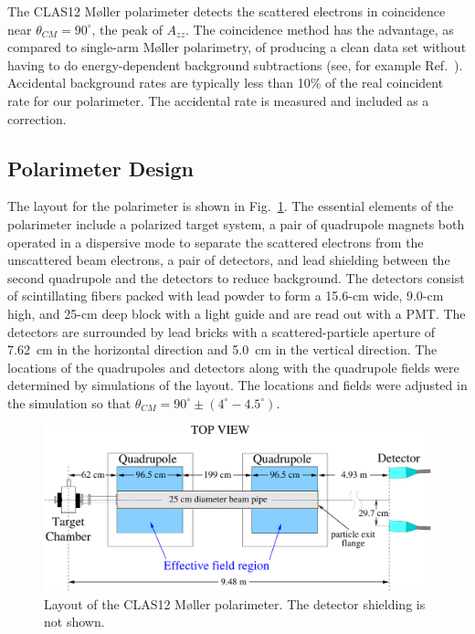 The CLAS12 M{\o}ller polarimeter detects the scattered electrons in coincidence near $\theta_{CM}=90^\circ$, the
peak of $A_{zz}$. The coincidence method has the advantage, as compared to single-arm M{\o}ller polarimetry, of
producing a clean data set without having to do energy-dependent background subtractions (see, for example
Ref.~\cite{arrington92}). Accidental background rates are typically less than 10\% of the real coincident rate for
our polarimeter. The accidental rate is measured and included as a correction.

\subsection{Polarimeter Design}
\label{sec-PolDesign}

The layout for the polarimeter is shown in Fig.~\ref{fig-PolLayout}. The essential elements of the polarimeter include
a polarized target system, a pair of quadrupole magnets both operated in a dispersive mode to separate the
scattered electrons from the unscattered beam electrons, a pair of detectors, and lead shielding between the second
quadrupole and the detectors to reduce background. The detectors consist of scintillating fibers packed with lead
powder to form a 15.6-cm wide, 9.0-cm high, and 25-cm deep block with a light guide and are read out with a PMT. The
detectors are surrounded by lead bricks with a scattered-particle aperture of 7.62~cm in the horizontal direction and
5.0~cm in the vertical direction. The locations of the quadrupoles and detectors along with the quadrupole fields were
determined by simulations of the layout. The locations and fields were adjusted in the simulation so that
$\theta_{CM}=90^\circ\pm (4^\circ-4.5^\circ)$.

\begin{figure}[hbtp]
 \begin{center}
  \includegraphics[width=\textwidth]{MPLayout.pdf}
 \end{center}
 \caption{Layout of the CLAS12 M{\o}ller polarimeter. The detector shielding is not shown.}
 \label{fig-PolLayout}
\end{figure}

